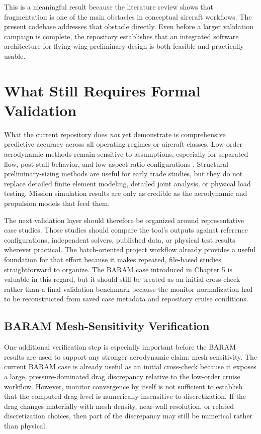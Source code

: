 \documentclass[12pt]{report}
\begin{document}
This is a meaningful result because the literature review shows that fragmentation is one of the main obstacles in conceptual aircraft workflows. The present codebase addresses that obstacle directly. Even before a larger validation campaign is complete, the repository establishes that an integrated software architecture for flying-wing preliminary design is both feasible and practically usable.

\section{What Still Requires Formal Validation}
What the current repository does \emph{not} yet demonstrate is comprehensive predictive accuracy across all operating regimes or aircraft classes. Low-order aerodynamic methods remain sensitive to assumptions, especially for separated flow, post-stall behavior, and low-aspect-ratio configurations \cite{Yu2022ICAS,RosasCordova2024VSPAERO}. Structural preliminary-sizing methods are useful for early trade studies, but they do not replace detailed finite element modeling, detailed joint analysis, or physical load testing. Mission simulation results are only as credible as the aerodynamic and propulsion models that feed them.

The next validation layer should therefore be organized around representative case studies. Those studies should compare the tool's outputs against reference configurations, independent solvers, published data, or physical test results wherever practical. The batch-oriented project workflow already provides a useful foundation for that effort because it makes repeated, file-based studies straightforward to organize. The BARAM case introduced in Chapter 5 is valuable in this regard, but it should still be treated as an initial cross-check rather than a final validation benchmark because the monitor normalization had to be reconstructed from saved case metadata and repository cruise conditions.

\subsection{BARAM Mesh-Sensitivity Verification}
One additional verification step is especially important before the BARAM results are used to support any stronger aerodynamic claim: mesh sensitivity. The current BARAM case is already useful as an initial cross-check because it exposes a large, pressure-dominated drag discrepancy relative to the low-order cruise workflow. However, monitor convergence by itself is not sufficient to establish that the computed drag level is numerically insensitive to discretization. If the drag changes materially with mesh density, near-wall resolution, or related discretization choices, then part of the discrepancy may still be numerical rather than physical.
\end{document}
